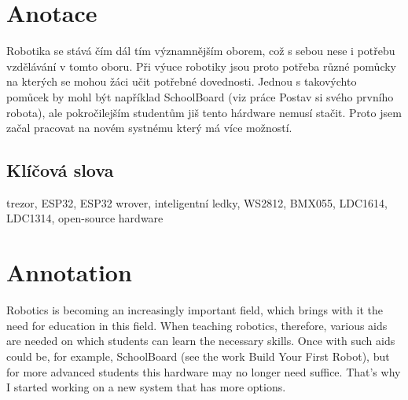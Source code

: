 \documentclass{template/socthesis}
\author{Tomáš Vavrinec} %
\begin{document}

\maketitle %



\pagestyle{empty}

\section*{Anotace}
\color{black}

Robotika se stává čím dál tím významnějším oborem, což s sebou nese i potřebu vzdělávání v tomto oboru.
Při výuce robotiky jsou proto potřeba různé pomůcky na kterých se mohou žáci učit potřebné dovednosti. Jednou s takovýchto pomůcek 
by mohl být například SchoolBoard (viz práce Postav si svého prvního robota), ale pokročilejším studentům jiš tento hárdware nemusí
stačit. Proto jsem začal pracovat na novém systnému který má více možností.

\subsection*{Klíčová slova}

\color{black}

trezor, ESP32, ESP32 wrover, inteligentní ledky, WS2812, BMX055, LDC1614, LDC1314, open-source hardware

\newpage %

\vspace{20mm}

\section*{Annotation}
\color{black}

Robotics is becoming an increasingly important field, which brings with it the need for education in this field.
When teaching robotics, therefore, various aids are needed on which students can learn the necessary skills. Once with such aids
could be, for example, SchoolBoard (see the work Build Your First Robot), but for more advanced students this hardware may no 
longer need suffice. That's why I started working on a new system that has more options.
\end{document}
